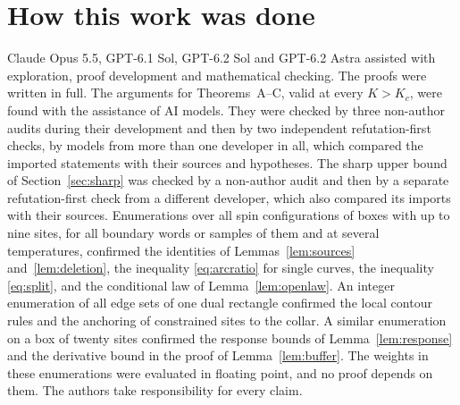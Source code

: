 \section{How this work was done}
Claude Opus 5.5, GPT-6.1 Sol, GPT-6.2 Sol and GPT-6.2 Astra assisted with exploration, proof development and mathematical checking. The proofs were written in full. The arguments for Theorems~A--C, valid at every $K>K_c$, were found with the assistance of AI models. They were checked by three non-author audits during their development and then by two independent refutation-first checks, by models from more than one developer in all, which compared the imported statements with their sources and hypotheses. The sharp upper bound of Section~\ref{sec:sharp} was checked by a non-author audit and then by a separate refutation-first check from a different developer, which also compared its imports with their sources. Enumerations over all spin configurations of boxes with up to nine sites, for all boundary words or samples of them and at several temperatures, confirmed the identities of Lemmas~\ref{lem:sources} and~\ref{lem:deletion}, the inequality \eqref{eq:arcratio} for single curves, the inequality \eqref{eq:split}, and the conditional law of Lemma~\ref{lem:openlaw}. An integer enumeration of all edge sets of one dual rectangle confirmed the local contour rules and the anchoring of constrained sites to the collar. A similar enumeration on a box of twenty sites confirmed the response bounds of Lemma~\ref{lem:response} and the derivative bound in the proof of Lemma~\ref{lem:buffer}. The weights in these enumerations were evaluated in floating point, and no proof depends on them. The authors take responsibility for every claim.
